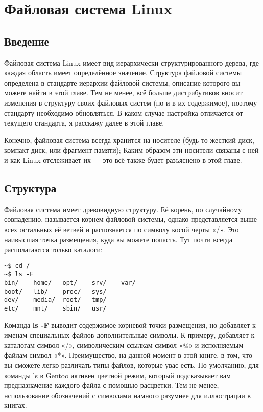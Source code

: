 \documentclass[12pt]{book}
\begin{document}
\chapter{Файловая система Linux}

\section*{Введение}

Файловая система Linux имеет вид иерархически структурированного дерева, где каждая область имеет определённое значение. Структура файловой системы  определена в стандарте иерархии файловой системы, описание которого вы можете найти в этой главе. Тем не менее, всё больше дистрибутивов вносит изменения в структуру своих файловых систем (но и в их содержимое), поэтому стандарту необходимо обновляться. В каком случае настройка отличается от текущего стандарта, я расскажу далее в этой главе.

Конечно, файловая система всегда хранится на носителе (будь то жесткий диск, компакт-диск, или фрагмент памяти); Каким образом эти носители связаны с ней и как Linux отслеживает их — это всё также будет разъяснено в этой главе.

\section{Структура}

Файловая система имеет древовидную структуру. Её корень, по случайному совпадению, называется корнем файловой системы, однако представляется выше всех остальных её ветвей и распознается по символу косой черты «/». Это наивысшая точка размещения, куда вы можете попасть. Тут почти всегда располагаются только каталоги:

\vspace{3mm}
\begin{tcolorbox}
\begin{lstlisting}
~$ cd /
~$ ls -F
bin/	home/	opt/	srv/	var/
boot/	lib/	proc/	sys/
dev/	media/	root/	tmp/
etc/	mnt/	sbin/	usr/
\end{lstlisting}
\end{tcolorbox}

Команда \textbf{ls -F} выводит содержимое корневой точки размещения, но добавляет к именам специальных файлов дополнительные символы. К примеру, добавляет к   каталогам символ «/», символическим ссылкам символ «@» и исполняемым файлам символ «*». Преимущество, на данной момент в этой книге, в том, что вы сможете легко различать типы файлов, которые увас есть. По умолчанию, для команды ls в Gentoo активен цветной режим, который подсказывает вам предназначение каждого файла с помощью расцветки. Тем не менее, нспользование обозначений с символами намного разумнее для иллюстрации в книгах.
\end{document}
